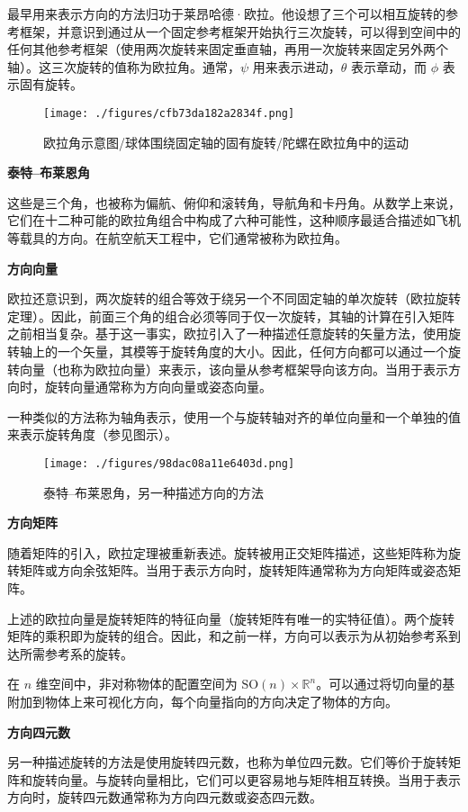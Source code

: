 最早用来表示方向的方法归功于莱昂哈德·欧拉。他设想了三个可以相互旋转的参考框架，并意识到通过从一个固定参考框架开始执行三次旋转，可以得到空间中的任何其他参考框架（使用两次旋转来固定垂直轴，再用一次旋转来固定另外两个轴）。这三次旋转的值称为欧拉角。通常，\(\psi\) 用来表示进动，\(\theta\) 表示章动，而 \(\phi\) 表示固有旋转。
\begin{figure}[ht]
\centering
\texttt{[image: ./figures/cfb73da182a2834f.png]}
\caption{欧拉角示意图/球体围绕固定轴的固有旋转/陀螺在欧拉角中的运动} \label{fig_GTDL_3}
\end{figure}
\textbf{泰特–布莱恩角}

这些是三个角，也被称为偏航、俯仰和滚转角，导航角和卡丹角。从数学上来说，它们在十二种可能的欧拉角组合中构成了六种可能性，这种顺序最适合描述如飞机等载具的方向。在航空航天工程中，它们通常被称为欧拉角。

\textbf{方向向量} 
 
欧拉还意识到，两次旋转的组合等效于绕另一个不同固定轴的单次旋转（欧拉旋转定理）。因此，前面三个角的组合必须等同于仅一次旋转，其轴的计算在引入矩阵之前相当复杂。基于这一事实，欧拉引入了一种描述任意旋转的矢量方法，使用旋转轴上的一个矢量，其模等于旋转角度的大小。因此，任何方向都可以通过一个旋转向量（也称为欧拉向量）来表示，该向量从参考框架导向该方向。当用于表示方向时，旋转向量通常称为方向向量或姿态向量。

一种类似的方法称为轴角表示，使用一个与旋转轴对齐的单位向量和一个单独的值来表示旋转角度（参见图示）。
\begin{figure}[ht]
\centering
\texttt{[image: ./figures/98dac08a11e6403d.png]}
\caption{泰特–布莱恩角，另一种描述方向的方法} \label{fig_GTDL_4}
\end{figure}
\textbf{方向矩阵}

随着矩阵的引入，欧拉定理被重新表述。旋转被用正交矩阵描述，这些矩阵称为旋转矩阵或方向余弦矩阵。当用于表示方向时，旋转矩阵通常称为方向矩阵或姿态矩阵。

上述的欧拉向量是旋转矩阵的特征向量（旋转矩阵有唯一的实特征值）。两个旋转矩阵的乘积即为旋转的组合。因此，和之前一样，方向可以表示为从初始参考系到达所需参考系的旋转。

在 \( n \) 维空间中，非对称物体的配置空间为 \( \text{SO}(n) \times \mathbb{R}^n \)。可以通过将切向量的基附加到物体上来可视化方向，每个向量指向的方向决定了物体的方向。

\textbf{方向四元数}

另一种描述旋转的方法是使用旋转四元数，也称为单位四元数。它们等价于旋转矩阵和旋转向量。与旋转向量相比，它们可以更容易地与矩阵相互转换。当用于表示方向时，旋转四元数通常称为方向四元数或姿态四元数。
